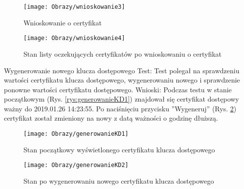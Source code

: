 \documentclass[twoside,10pt]{article}
\begin{document}
\begin{enumerate*}
\begin{figure}[ht!]
\begin{minipage}{0.3\textwidth}
\texttt{[image: Obrazy/wnioskowanie3]}
\caption{Wnioskowanie o certyfikat}
\label{rys:wnioskowanie3}
\end{minipage}
\hspace{0.01\textwidth}
\begin{minipage}{0.3\textwidth}
\texttt{[image: Obrazy/wnioskowanie4]}
\caption{Stan listy oczekujących certyfikatów po wnioskowaniu o certyfikat}
\label{rys:wnioskowanie4}
\end{minipage}
\end{figure}
\newpage
\item Wygenerowanie nowego klucza dostępowego\newline
Test: Test polegał na sprawdzeniu wartości certyfikatu klucza dostępowego, wygenerowaniu nowego i sprawdzenie ponowne wartości certyfikatu dostępowego.\newline
Wnioski: Podczas testu w stanie początkowym (Rys. \ref{rys:generowanieKD1}) znajdował się certyfikat dostępowy ważny do 2019.01.26 14:23:55. Po naciśnięciu przycisku ''Wygeneruj'' (Rys. \ref{rys:generowanieKD2}) certyfikat został zmieniony na nowy z datą ważności o godzinę dłuższą.
\begin{figure}[ht!]
\centering
\begin{minipage}{0.3\textwidth}
\texttt{[image: Obrazy/generowanieKD1]}
\caption{Stan początkowy wyświetlonego certyfikatu klucza dostępowego }
\label{rys:generowanieKD1}
\end{minipage}
\hspace{0.01\textwidth}
\begin{minipage}{0.3\textwidth}
\texttt{[image: Obrazy/generowanieKD2]}
\caption{Stan po wygenerowaniu nowego certyfikatu klucza dostępowego}
\label{rys:generowanieKD2}
\end{minipage}
\end{figure}


\end{enumerate*}
\end{document}
